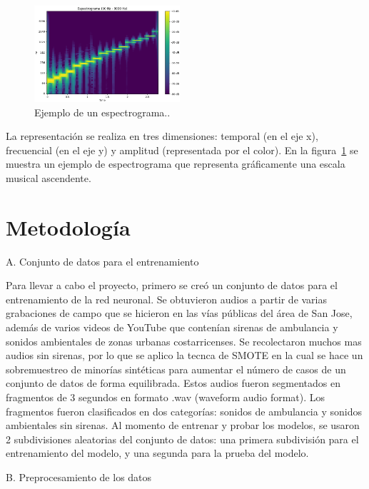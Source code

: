 \documentclass[conference, spanish, english]{IEEEtran}
\begin{document}
\begin{figure}[H]
\centering
\includegraphics[width=0.48\textwidth]{espectrogramas/espectrograma_ejemplo.png}
\caption{Ejemplo de un espectrograma..}
\label{fig:ejemploEspectograma}
\end{figure}

La representación se realiza en tres dimensiones: temporal (en el eje x), frecuencial (en el eje y) y amplitud (representada por el color). En la figura~\ref{fig:ejemploEspectograma} se muestra un ejemplo de espectrograma que representa gráficamente una escala musical ascendente.

\section{Metodología}
\begin{center}
    A. Conjunto de datos para el entrenamiento
\end{center}

Para llevar a cabo el proyecto, primero se creó un conjunto de datos para el entrenamiento de la red neuronal. Se obtuvieron audios a partir de varias grabaciones de campo que se hicieron en las vías públicas del área de San Jose, además de varios videos de YouTube que contenían sirenas de ambulancia y sonidos ambientales de zonas urbanas costarricenses.\cite{likebupt_smote} Se recolectaron muchos mas audios sin sirenas, por lo que se aplico la tecnca de SMOTE en la cual se hace un sobremuestreo de minorías sintéticas para aumentar el número de casos de un conjunto de datos de forma equilibrada.
Estos audios fueron segmentados en fragmentos de 3 segundos en formato .wav (waveform audio format). Los fragmentos fueron clasificados en dos categorías: sonidos de ambulancia y sonidos ambientales sin sirenas. Al momento de entrenar y probar los modelos, se usaron 2 subdivisiones aleatorias del conjunto de datos: una primera subdivisión para el entrenamiento del modelo, y una segunda para la prueba del modelo.

\begin{center}
    B. Preprocesamiento de los datos
\end{center}
\end{document}
